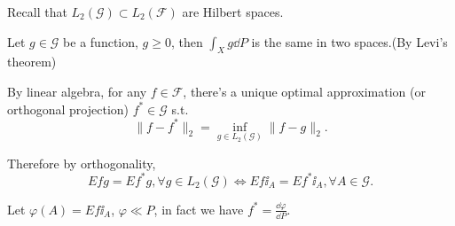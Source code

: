 Recall that $L_2(\mathscr{G}) \subset L_2(\mathscr{F})$ are Hilbert spaces.

Let $g \in \mathscr{G}$ be a function, $g \ge 0$, then $\int_X g\dd P$ is
the same in two spaces.(By Levi's theorem)

By linear algebra, for any $f\in \mathscr{F}$,
there's a unique optimal approximation (or orthogonal projection)
$f^*\in \mathscr{G}$ s.t.
\[
\lVert f - f^* \rVert _2 = \inf_{g\in L_2(\mathscr{G})} \lVert f - g \rVert _2.
\]

Therefore by orthogonality,
\[
Efg = Ef^*g, \forall g\in L_2(\mathscr{G}) \iff Ef\ii_A = Ef^*\ii_A,
\forall A\in \mathscr{G}.
\]

Let $\varphi(A) = Ef\ii_A$,  $\varphi \ll P$,
in fact we have $f^* = \frac{\dd\varphi}{\dd P}$.
